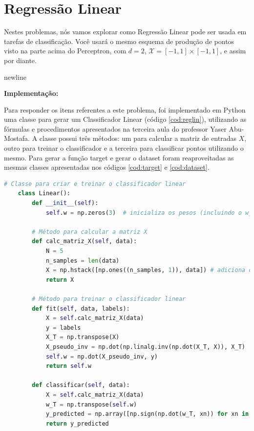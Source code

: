 \section{Regressão Linear}

Nestes problemas, nós vamos explorar como Regressão Linear pode ser usada em tarefas de classificação.
Você usará o mesmo esquema de produção de pontos visto na parte acima do Perceptron, com $d = 2$,
$\mathcal{X} = [-1, 1] \times [-1, 1]$, e assim por diante.

newline \par
\textbf{Implementação:}

Para responder os itens referentes a este problema, foi implementado em Python uma classe para gerar um Classificador Linear (código \ref{cod:reglin}), utilizando as fórmulas e procedimentos apresentados na terceira aula do professor Yaser Abu-Mostafa. A classe possui três métodos: um para calcular a matriz de entradas $X$, outro para treinar o classificador e a terceira para classificar pontos utilizando o mesmo. Para gerar a função target e gerar o dataset foram reaproveitadas as mesmas classes apresentadas nos códigos \ref{cod:target} e \ref{cod:dataset}.

\begin{lstlisting}[language=Python, caption=Classificador por Regressão Linear, label=cod:reglin]
    # Classe para criar e treinar o classificador linear
    class Linear():
        def __init__(self):
            self.w = np.zeros(3)  # inicializa os pesos (incluindo o w_0)
        
        # Método para calcular a matriz X
        def calc_matriz_X(self, data):
            N = 5
            n_samples = len(data)
            X = np.hstack([np.ones((n_samples, 1)), data]) # adiciona coluna de 1s
            return X
        
        # Método para treinar o classificador linear
        def fit(self, data, labels):
            X = self.calc_matriz_X(data)
            y = labels
            X_T = np.transpose(X)
            X_pseudo_inv = np.dot(np.linalg.inv(np.dot(X_T, X)), X_T)
            self.w = np.dot(X_pseudo_inv, y)
            return self.w
        
        def classificar(self, data):
            X = self.calc_matriz_X(data)
            w_T = np.transpose(self.w)
            y_predicted = np.array([np.sign(np.dot(w_T, xn)) for xn in X])
            return y_predicted
\end{lstlisting}


